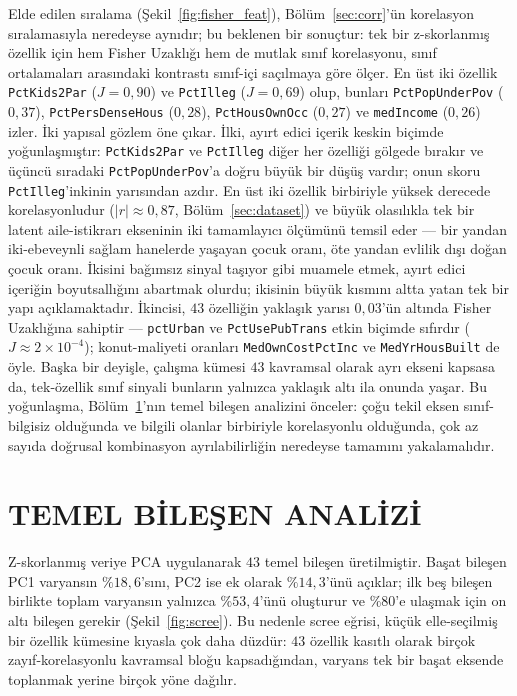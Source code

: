 \documentclass{ieeeaccess}
\begin{document}
Elde edilen sıralama (Şekil~\ref{fig:fisher_feat}), Bölüm~\ref{sec:corr}'ün korelasyon sıralamasıyla neredeyse aynıdır; bu beklenen bir sonuçtur: tek bir z-skorlanmış özellik için hem Fisher Uzaklığı hem de mutlak sınıf korelasyonu, sınıf ortalamaları arasındaki kontrastı sınıf-içi saçılmaya göre ölçer. En üst iki özellik \texttt{PctKids2Par} ($J\!=\!0{,}90$) ve \texttt{PctIlleg} ($J\!=\!0{,}69$) olup, bunları \texttt{PctPopUnderPov} ($0{,}37$), \texttt{PctPersDenseHous} ($0{,}28$), \texttt{PctHousOwnOcc} ($0{,}27$) ve \texttt{medIncome} ($0{,}26$) izler. İki yapısal gözlem öne çıkar. İlki, ayırt edici içerik keskin biçimde yoğunlaşmıştır: \texttt{PctKids2Par} ve \texttt{PctIlleg} diğer her özelliği gölgede bırakır ve üçüncü sıradaki \texttt{PctPopUnderPov}'a doğru büyük bir düşüş vardır; onun skoru \texttt{PctIlleg}'inkinin yarısından azdır. En üst iki özellik birbiriyle yüksek derecede korelasyonludur ($|r|\approx 0{,}87$, Bölüm~\ref{sec:dataset}) ve büyük olasılıkla tek bir latent aile-istikrarı ekseninin iki tamamlayıcı ölçümünü temsil eder --- bir yandan iki-ebeveynli sağlam hanelerde yaşayan çocuk oranı, öte yandan evlilik dışı doğan çocuk oranı. İkisini bağımsız sinyal taşıyor gibi muamele etmek, ayırt edici içeriğin boyutsallığını abartmak olurdu; ikisinin büyük kısmını altta yatan tek bir yapı açıklamaktadır. İkincisi, $43$ özelliğin yaklaşık yarısı $0{,}03$'ün altında Fisher Uzaklığına sahiptir --- \texttt{pctUrban} ve \texttt{PctUsePubTrans} etkin biçimde sıfırdır ($J\approx 2\times 10^{-4}$); konut-maliyeti oranları \texttt{MedOwnCostPctInc} ve \texttt{MedYrHousBuilt} de öyle. Başka bir deyişle, çalışma kümesi $43$ kavramsal olarak ayrı ekseni kapsasa da, tek-özellik sınıf sinyali bunların yalnızca yaklaşık altı ila onunda yaşar. Bu yoğunlaşma, Bölüm~\ref{sec:pca}'nın temel bileşen analizini önceler: çoğu tekil eksen sınıf-bilgisiz olduğunda ve bilgili olanlar birbiriyle korelasyonlu olduğunda, çok az sayıda doğrusal kombinasyon ayrılabilirliğin neredeyse tamamını yakalamalıdır.

\section{TEMEL BİLEŞEN ANALİZİ}
\label{sec:pca}
Z-skorlanmış veriye PCA \cite{jolliffe} uygulanarak $43$ temel bileşen üretilmiştir. Başat bileşen PC1 varyansın $\%18{,}6$'sını, PC2 ise ek olarak $\%14{,}3$'ünü açıklar; ilk beş bileşen birlikte toplam varyansın yalnızca $\%53{,}4$'ünü oluşturur ve $\%80$'e ulaşmak için on altı bileşen gerekir (Şekil~\ref{fig:scree}). Bu nedenle scree eğrisi, küçük elle-seçilmiş bir özellik kümesine kıyasla çok daha düzdür: $43$ özellik kasıtlı olarak birçok zayıf-korelasyonlu kavramsal bloğu kapsadığından, varyans tek bir başat eksende toplanmak yerine birçok yöne dağılır.
\end{document}
